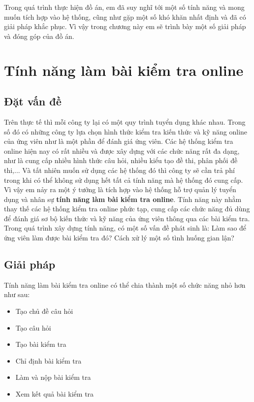 \documentclass[../DoAn.tex]{subfiles}
\begin{document}
\raggedbottom
Trong quá trình thực hiện đồ án, em đã suy nghĩ tới một số tính năng và mong muốn tích hợp vào hệ thống, cũng như gặp một số khó khăn nhất định và đã có giải pháp khắc phục. Vì vậy trong chương này em sẽ trình bày một số giải pháp và đóng góp của đồ án.

\section{Tính năng làm bài kiểm tra online}
\subsection{Đặt vấn đề}
Trên thực tế thì mỗi công ty lại có một quy trình tuyển dụng khác nhau. Trong số đó có những công ty lựa chọn hình thức kiểm tra kiến thức và kỹ năng online của ứng viên như là một phần để đánh giá ứng viên. Các hệ thống kiểm tra online hiện nay có rất nhiều và được xây dựng với các chức năng rất đa dạng, như là cung cấp nhiều hình thức câu hỏi, nhiều kiểu tạo đề thi, phân phối đề thi,... Và tất nhiên muốn sử dụng các hệ thống đó thì công ty sẽ cần trả phí trong khi có thể không sử dụng hết tất cả tính năng mà hệ thống đó cung cấp. Vì vậy em nảy ra một ý tưởng là tích hợp vào hệ thống hỗ trợ quản lý tuyển dụng và nhân sự \textbf{tính năng làm bài kiểm tra online}. Tính năng này nhằm thay thế các hệ thống kiểm tra online phức tạp, cung cấp các chức năng đủ dùng để đánh giá sơ bộ kiến thức và kỹ năng của ứng viên thông qua các bài kiểm tra. Trong quá trình xây dựng tính năng, có một số vấn đề phát sinh là: Làm sao để ứng viên làm được bài kiểm tra đó? Cách xử lý một số tình huống gian lận?

\subsection{Giải pháp}
Tính năng làm bài kiểm tra online có thể chia thành một số chức năng nhỏ hơn như sau:

\begin{itemize}
    \item Tạo chủ đề câu hỏi
    \item Tạo câu hỏi
    \item Tạo bài kiểm tra
    \item Chỉ định bài kiểm tra
    \item Làm và nộp bài kiểm tra
    \item Xem kết quả bài kiểm tra
\end{itemize}
\end{document}
